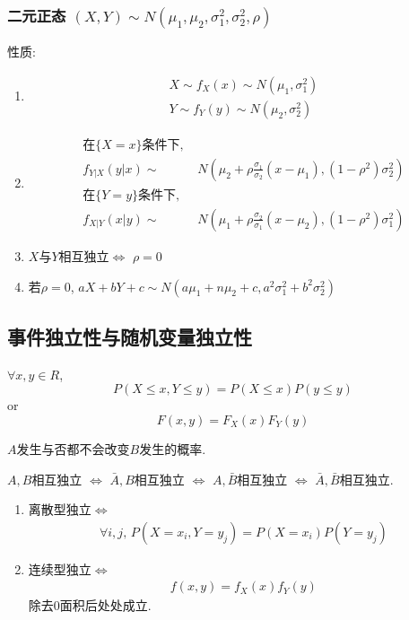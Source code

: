 \subsubsection{二元正态 \texorpdfstring{$(X,Y)\sim N(\mu_1,\mu_2,\sigma_1^2,\sigma_2^2,\rho )$}.}
性质:
\begin{enumerate}
    \item \begin{align*}
        X\sim f_X(x)\sim N(\mu_1,\sigma_1^2)\\
        Y\sim f_Y(y)\sim N(\mu_2,\sigma_2^2)
    \end{align*}
    \item \begin{align*}
        \text{在$\{X=x\}$条件下, }& \\
        f_{Y|X}(y|x)\sim &N(\mu_2+\rho \frac{\sigma_1}{\sigma_2}(x-\mu_1),(1-\rho^2)\sigma_2^2)\\
        \text{在$\{Y=y\}$条件下, }& \\
        f_{X|Y}(x|y)\sim &N(\mu_1+\rho \frac{\sigma_2}{\sigma_1}(x-\mu_2),(1-\rho^2)\sigma_1^2)
    \end{align*}
    \item $X$与$Y$相互独立$\Longleftrightarrow$ $\rho=0$
    \item 若$\rho=0$, $aX+bY+c\sim N(a\mu_1+n\mu_2+c,a^2\sigma_1^2+b^2\sigma_2^2)$
\end{enumerate}

\subsection{事件独立性与随机变量独立性}
\begin{definition}
    $\forall x,y \in R$, 
    \[P(X\le x,Y\le y)=P(X\le x)P(y\le y)\]
    or
    \[F(x,y)=F_X(x)F_Y(y)\]
\end{definition}

$A$发生与否都不会改变$B$发生的概率. 

$A,B$相互独立 $\Longleftrightarrow$ $\bar{A},B$相互独立 $\Longleftrightarrow$ $A,\bar{B}$相互独立 $\Longleftrightarrow$ $\bar{A},\bar{B}$相互独立. 

\begin{enumerate}
    \item 离散型独立$\Longleftrightarrow$
    \begin{align*}
        \forall i,j,\, P(X=x_i,Y=y_j)=P(X=x_i)P(Y=y_j)
    \end{align*}
    \item 连续型独立$\Longleftrightarrow$
    \begin{align*}
        f(x,y)=f_X(x)f_Y(y)
    \end{align*}
    除去0面积后处处成立. 
\end{enumerate}

